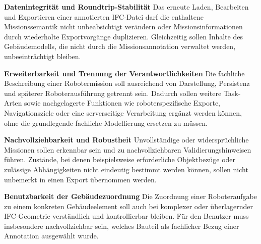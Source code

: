\textbf{Datenintegrität und Roundtrip-Stabilität  }\newline
Das erneute Laden, Bearbeiten und Exportieren einer annotierten IFC-Datei darf die enthaltene
Missionssemantik nicht unbeabsichtigt verändern oder Missionsinformationen durch wiederholte
Exportvorgänge duplizieren. Gleichzeitig sollen Inhalte des Gebäudemodells, die nicht durch die
Missionsannotation verwaltet werden, unbeeinträchtigt bleiben.

\textbf{Erweiterbarkeit und Trennung der Verantwortlichkeiten  }\newline
Die fachliche Beschreibung einer Robotermission soll ausreichend von Darstellung, Persistenz und
späterer Roboterausführung getrennt sein. Dadurch sollen weitere Task-Arten sowie nachgelagerte
Funktionen wie roboterspezifische Exporte, Navigationsziele oder eine serverseitige Verarbeitung
ergänzt werden können, ohne die grundlegende fachliche Modellierung ersetzen zu müssen.

\textbf{Nachvollziehbarkeit und Robustheit  }\newline
Unvollständige oder widersprüchliche Missionen sollen erkennbar sein und zu nachvollziehbaren
Validierungshinweisen führen. Zustände, bei denen beispielsweise erforderliche Objektbezüge oder
zulässige Abhängigkeiten nicht eindeutig bestimmt werden können, sollen nicht unbemerkt in einen
Export übernommen werden.

\textbf{Benutzbarkeit der Gebäudezuordnung  }\newline
Die Zuordnung einer Roboteraufgabe zu einem konkreten Gebäudeelement soll auch bei komplexer oder
überlagernder IFC-Geometrie verständlich und kontrollierbar bleiben. Für den Benutzer muss
insbesondere nachvollziehbar sein, welches Bauteil als fachlicher Bezug einer Annotation ausgewählt
wurde.

